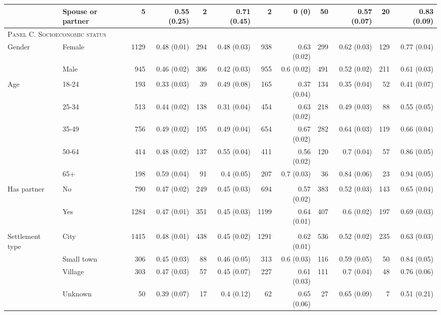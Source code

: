 \begin{tabular}{p{1.2in}p{1.2in}rrrrrrrrrr}
	& Spouse or partner & 5 & 0.55 (0.25) & 2 & 0.71 (0.45) & 2 & 0 (0) & 50 & 0.57 (0.07) & 20 & 0.83 (0.09) \\ 
	 \midrule
	\multicolumn{12}{l}{\textsc{Panel C. Socioeconomic status}} \\
Gender & Female & 1129 & 0.48 (0.01) & 294 & 0.48 (0.03) & 938 & 0.63 (0.02) & 299 & 0.62 (0.03) & 129 & 0.77 (0.04) \\ 
 & Male & 945 & 0.46 (0.02) & 306 & 0.42 (0.03) & 955 & 0.6 (0.02) & 491 & 0.52 (0.02) & 211 & 0.61 (0.03) \\ 
	\vspace{1pt}\\
Age & 18-24 & 193 & 0.33 (0.03) & 39 & 0.49 (0.08) & 165 & 0.37 (0.04) & 134 & 0.35 (0.04) & 52 & 0.41 (0.07) \\ 
 & 25-34 & 513 & 0.44 (0.02) & 138 & 0.31 (0.04) & 454 & 0.63 (0.02) & 218 & 0.49 (0.03) & 88 & 0.55 (0.05) \\ 
 & 35-49 & 756 & 0.49 (0.02) & 195 & 0.49 (0.04) & 654 & 0.67 (0.02) & 282 & 0.64 (0.03) & 119 & 0.66 (0.04) \\ 
 & 50-64 & 414 & 0.48 (0.02) & 137 & 0.55 (0.04) & 411 & 0.56 (0.02) & 120 & 0.7 (0.04) & 57 & 0.86 (0.05) \\ 
 & 65+ & 198 & 0.59 (0.04) & 91 & 0.4 (0.05) & 207 & 0.7 (0.03) & 36 & 0.84 (0.06) & 23 & 0.94 (0.05) \\ 
	\vspace{1pt}\\
Has partner & No & 790 & 0.47 (0.02) & 249 & 0.45 (0.03) & 694 & 0.57 (0.02) & 383 & 0.52 (0.03) & 143 & 0.65 (0.04) \\ 
 & Yes & 1284 & 0.47 (0.01) & 351 & 0.45 (0.03) & 1199 & 0.64 (0.01) & 407 & 0.6 (0.02) & 197 & 0.69 (0.03) \\ 
	\vspace{1pt}\\
Settlement type & City & 1415 & 0.48 (0.01) & 438 & 0.45 (0.02) & 1291 & 0.62 (0.01) & 536 & 0.52 (0.02) & 235 & 0.63 (0.03) \\ 
 & Small town & 306 & 0.45 (0.03) & 88 & 0.46 (0.05) & 313 & 0.6 (0.03) & 116 & 0.59 (0.05) & 50 & 0.84 (0.05) \\ 
 & Village & 303 & 0.47 (0.03) & 57 & 0.45 (0.07) & 227 & 0.61 (0.03) & 111 & 0.7 (0.04) & 48 & 0.76 (0.06) \\ 
 & Unknown & 50 & 0.39 (0.07) & 17 & 0.4 (0.12) & 62 & 0.65 (0.06) & 27 & 0.65 (0.09) & 7 & 0.51 (0.21) \\ 

\end{tabular}

